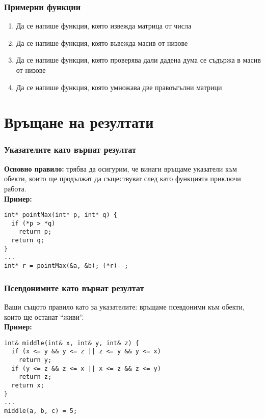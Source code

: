 \documentclass[alsotrans]{beamerswitch}
\begin{document}
\begin{frame}
  \frametitle{Примерни функции}

  \begin{enumerate}[<+->]
  \item Да се напише функция, която извежда матрица от числа
  \item Да се напише функция, която въвежда масив от низове
  \item Да се напише функция, която проверява дали дадена дума се съдържа в масив от низове
  \item Да се напише функция, която умножава две правоъгълни матрици
  \end{enumerate}
\end{frame}

\section{Връщане на резултати}

\begin{frame}[fragile]
  \frametitle{Указателите като върнат резултат}

  \textbf{Основно правило:} трябва да осигурим, че винаги връщаме указатели към обекти, които ще продължат да съществуват след като функцията приключи работа.\\[2em]
  \pause
  \textbf{Пример:}
\begin{lstlisting}
int* pointMax(int* p, int* q) {
  if (*p > *q)
    return p;
  return q;
}
...
int* r = pointMax(&a, &b); (*r)--;
\end{lstlisting}
\end{frame}

\begin{frame}[fragile]
  \frametitle{Псевдонимите като върнат резултат}

  Ваши същото правило като за указателите: връщаме псевдоними към обекти, които ще останат ``живи''.\\[2em]
  \pause
  \textbf{Пример:}
\begin{lstlisting}
int& middle(int& x, int& y, int& z) {
  if (x <= y && y <= z || z <= y && y <= x)
    return y;
  if (y <= z && z <= x || x <= z && z <= y)
    return z;
  return x;
}
...
middle(a, b, c) = 5;
\end{lstlisting}
\end{frame}
\end{document}
